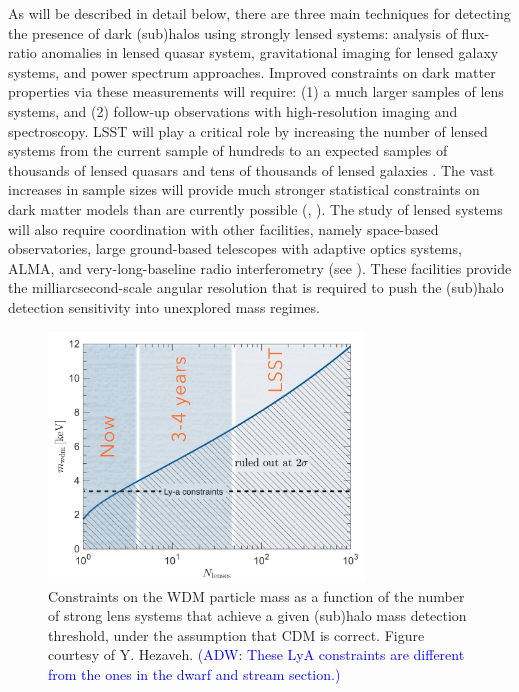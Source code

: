 \documentclass[modern,linenumbers]{aastex62}
\newcommand{\Comment}[3]{\textcolor{#1}{(#2: #3)}}
\newcommand{\ADW}[1]{\Comment{blue}{ADW}{#1}} %
\begin{document}
As will be described in detail below, there are three main techniques for detecting the presence of dark (sub)halos using strongly lensed systems: analysis of flux-ratio anomalies in lensed quasar system,
gravitational imaging for lensed galaxy systems, and power spectrum approaches. 
Improved constraints on dark matter properties via these measurements will require: (1) a much larger samples of lens systems, and (2) follow-up observations with high-resolution imaging and spectroscopy.
LSST will play a critical role by increasing the number of lensed systems from the current sample of hundreds to an expected samples of thousands of lensed quasars \citep{O+M10} and tens of thousands of lensed galaxies \citep{Collett2015}.
The vast increases in sample sizes will provide much stronger statistical constraints on dark matter models than are currently possible (\eg, ).
The study of lensed systems will also require coordination with other facilities, namely space-based observatories, large ground-based telescopes with adaptive optics systems, ALMA, and very-long-baseline radio interferometry (see ). These facilities provide the milliarcsecond-scale angular resolution that is required to push the (sub)halo detection sensitivity into unexplored mass regimes.

\begin{figure}
    \centering
    \includegraphics[width=0.75\textwidth]{figures/wdm_constraints_yh.jpg}
    \caption{Constraints on the WDM particle mass as a function of the number of strong lens systems that achieve a given (sub)halo mass detection threshold, under the assumption that CDM is correct.  Figure courtesy of Y. Hezaveh. \ADW{These LyA constraints are different from the ones in the dwarf and stream section.}}
    \label{fig:lensing_wdmlim_vs_nlens}
\end{figure}
\end{document}
